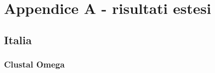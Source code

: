 \documentclass[a4paper,10pt]{article}
\begin{document}
\newpage

\section{Appendice A - risultati estesi}

\newpage

\subsection{Italia}

\subsubsection*{Clustal Omega}

\end{document}
